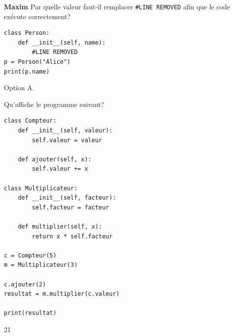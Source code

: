 \begin{Exercice}[5 minutes]\textbf{Maxim}
Par quelle valeur faut-il remplacer \texttt{\#LINE REMOVED} afin que le code exécute correctement?

\begin{lstlisting}[style=pythonstyle]
class Person:
    def __init__(self, name):
        #LINE REMOVED
p = Person("Alice")
print(p.name)
\end{lstlisting}


\begin{solution}
Option A.
\end{solution}

Qu'affiche le programme suivant?

\begin{lstlisting}[style=pythonstyle]
class Compteur:
    def __init__(self, valeur):
        self.valeur = valeur

    def ajouter(self, x):
        self.valeur += x

class Multiplicateur:
    def __init__(self, facteur):
        self.facteur = facteur

    def multiplier(self, x):
        return x * self.facteur

c = Compteur(5)
m = Multiplicateur(3)

c.ajouter(2)
resultat = m.multiplier(c.valeur)

print(resultat)
\end{lstlisting}

\begin{solution}
21
\end{solution}

\end{Exercice}


